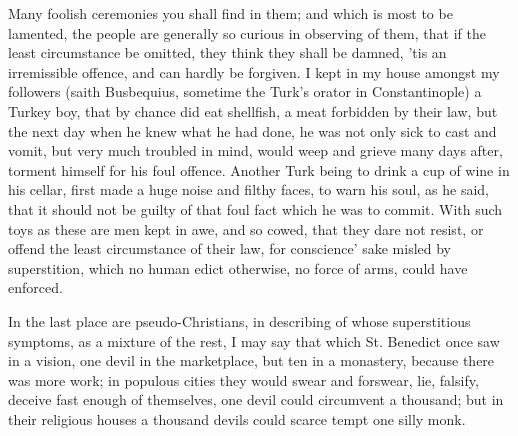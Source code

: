 {Many foolish ceremonies you shall find in them; and which is most to be
lamented, the people are generally so curious in observing of them,
that if the least circumstance be omitted, they think they shall be
damned, 'tis an irremissible offence, and can hardly be forgiven. I
kept in my house amongst my followers (saith Busbequius, sometime the
Turk's orator in Constantinople) a Turkey boy, that by chance did eat
shellfish, a meat forbidden by their law, but the next day when he knew
what he had done, he was not only sick to cast and vomit, but very much
troubled in mind, would weep and grieve many days after, torment
himself for his foul offence. Another Turk being to drink a cup of wine
in his cellar, first made a huge noise and filthy faces, to warn
his soul, as he said, that it should not be guilty of that foul fact
which he was to commit. With such toys as these are men kept in awe,
and so cowed, that they dare not resist, or offend the least
circumstance of their law, for conscience' sake misled by superstition,
which no human edict otherwise, no force of arms, could have enforced.

In the last place are pseudo-Christians, in describing of whose
superstitious symptoms, as a mixture of the rest, I may say that which
St. Benedict once saw in a vision, one devil in the marketplace, but
ten in a monastery, because there was more work; in populous cities
they would swear and forswear, lie, falsify, deceive fast enough of
themselves, one devil could circumvent a thousand; but in their
religious houses a thousand devils could scarce tempt one silly monk.

}
